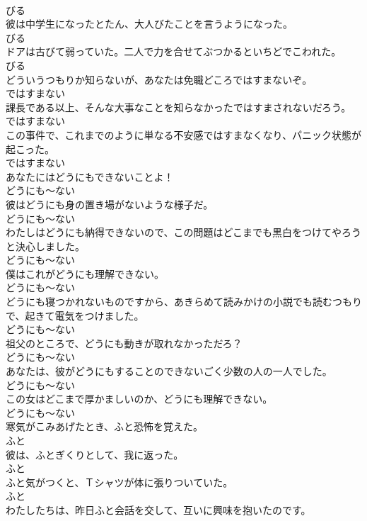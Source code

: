 \documentclass[8pt]{extreport}
\begin{document}
\begin{CJK}{UTF8}{min}
\\	びる
\\	彼は中学生になったとたん、大人びたことを言うようになった。	
\\	びる
\\	ドアは古びて弱っていた。二人で力を合せてぶつかるといちどでこわれた。	
\\	びる
\\	どういうつもりか知らないが、あなたは免職どころではすまないぞ。	
\\	ではすまない
\\	課長である以上、そんな大事なことを知らなかったではすまされないだろう。	
\\	ではすまない
\\	この事件で、これまでのように単なる不安感ではすまなくなり、パニック状態が起こった。	
\\	ではすまない
\\	あなたにはどうにもできないことよ！	
\\	どうにも～ない
\\	彼はどうにも身の置き場がないような様子だ。	
\\	どうにも～ない
\\	わたしはどうにも納得できないので、この問題はどこまでも黒白をつけてやろうと決心しました。	
\\	どうにも～ない
\\	僕はこれがどうにも理解できない。	
\\	どうにも～ない
\\	どうにも寝つかれないものですから、あきらめて読みかけの小説でも読むつもりで、起きて電気をつけました。	
\\	どうにも～ない
\\	祖父のところで、どうにも動きが取れなかっただろ？	
\\	どうにも～ない
\\	あなたは、彼がどうにもすることのできないごく少数の人の一人でした。	
\\	どうにも～ない
\\	この女はどこまで厚かましいのか、どうにも理解できない。	
\\	どうにも～ない
\\	寒気がこみあげたとき、ふと恐怖を覚えた。	
\\	ふと
\\	彼は、ふとぎくりとして、我に返った。	
\\	ふと
\\	ふと気がつくと、Ｔシャツが体に張りついていた。	
\\	ふと
\\	わたしたちは、昨日ふと会話を交して、互いに興味を抱いたのです。	

\end{CJK}
\end{document}
